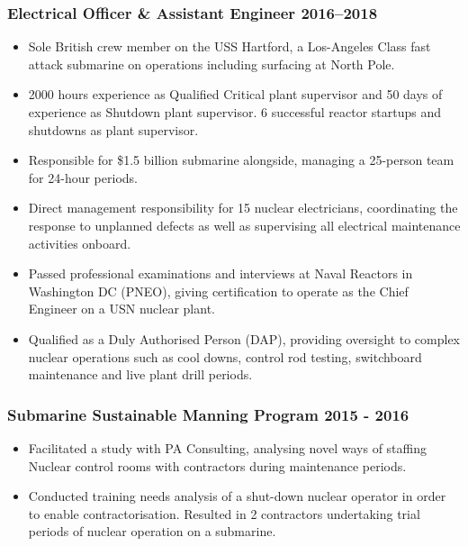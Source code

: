 \documentclass[a4paper, oneside, final, 11pt]{scrartcl} %
\begin{document}
\smallskip 
				
\subsubsection*{Electrical Officer \& Assistant Engineer \hfill 2016--2018}  
\normalfont
\begin{itemize}
	\item Sole British crew member on the USS Hartford, a Los-Angeles Class fast attack submarine on operations including surfacing at North Pole. 
	 
	\item 2000 hours experience as Qualified Critical plant supervisor and 50 days of experience as Shutdown plant supervisor. 6 successful reactor startups and shutdowns as plant supervisor.
	
\item  Responsible for \$1.5 billion submarine alongside, managing a 25-person team for 24-hour periods. 
\item Direct management responsibility for 15 nuclear electricians, coordinating the response to unplanned defects as well as supervising all electrical maintenance activities onboard. 

\item Passed professional examinations and interviews at Naval Reactors in Washington DC (PNEO), giving certification to operate as the Chief Engineer on a USN nuclear plant. 

\item Qualified as a Duly Authorised Person (DAP), providing oversight to complex nuclear operations such as cool downs, control rod testing, switchboard maintenance and live plant drill periods.
\end{itemize}

\smallskip 

\subsubsection*{Submarine Sustainable Manning Program \hfill 2015 - 2016}  
\normalfont
\begin{itemize}
	\item Facilitated a study with PA Consulting, analysing novel ways of staffing Nuclear control rooms with contractors during maintenance periods. 
	
	\item Conducted training needs analysis of a shut-down nuclear operator in order to enable contractorisation. Resulted in 2 contractors undertaking trial periods of nuclear operation on a submarine.\end{itemize}
\end{document}
